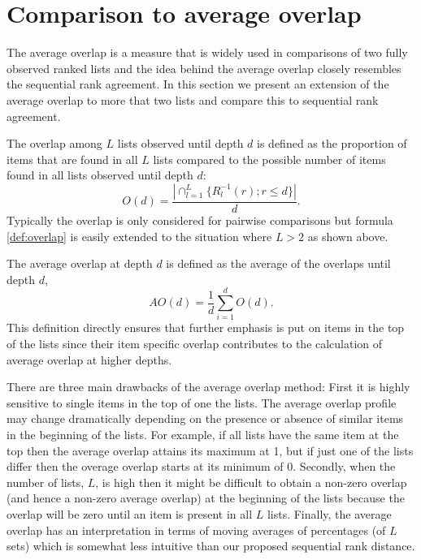 \documentclass[12pt,a4paper]{article}
\theoremstyle{plain}
\begin{document}
\section{Comparison to average overlap}

The average overlap is a measure that is widely used in comparisons of
two fully observed ranked lists \citep{Fagin2003,Webber2010} and the
idea behind the average overlap closely resembles the sequential rank
agreement. In this section we present an extension of the average
overlap to more that two lists and compare this to sequential rank
agreement.

The overlap among $L$ lists observed until depth $d$ is defined as the
proportion of items that are found in all $L$ lists compared to the
possible number of items found in all lists observed until depth $d$:
\begin{equation}
  O(d) = \frac{| \cap_{l=1}^L \{R_l^{-1}(r); r\leq d \} |}{d}. \label{def:overlap}
\end{equation}
Typically the overlap is only considered for pairwise comparisons
\citep{Bar-Ilan2006,Boulesteix2009} but formula \eqref{def:overlap}
is easily extended to the situation where $L>2$ as shown above.

The average overlap at depth $d$ is defined as the average of the
overlaps until depth $d$,
\begin{equation}
AO(d) = \frac1d\sum_{i=1}^d O(d).
\end{equation}
This definition directly ensures that further emphasis is put on items
in the top of the lists since their item specific overlap contributes
to the calculation of average overlap at higher depths.

There are three main drawbacks of the average overlap method: First it
is highly sensitive to single items in the top of one the lists.  The
average overlap profile may change dramatically depending on the
presence or absence of similar items in the beginning of the
lists. For example, if all lists have the same item at the top then
the average overlap attains its maximum at 1, but if just one of the
lists differ then the overage overlap starts at its minimum of
0. Secondly, when the number of lists, $L$, is high then it might be
difficult to obtain a non-zero overlap (and hence a non-zero average
overlap) at the beginning of the lists because the overlap will be
zero until an item is present in all $L$ lists. Finally, the average
overlap has an interpretation in terms of moving averages of
percentages (of $L$ sets) which is somewhat less intuitive than our
proposed sequential rank distance.
\end{document}
